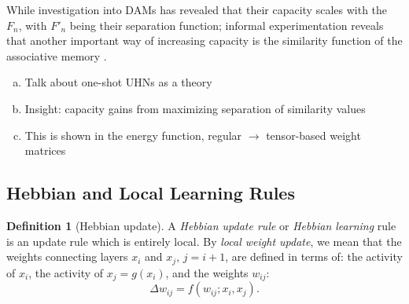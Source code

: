 \documentclass{article}
\theoremstyle{definition}
\newtheorem{definition}{Definition}[subsection]
\begin{document}
While investigation into DAMs has revealed that their capacity scales with
the $F_n$, with $F'_n$ being their separation function; informal experimentation
reveals that another important way of increasing capacity is the
similarity function
of the associative memory
\parencites{millidge_predictive_2022,hu_provably_2024}.

\begin{enumerate}[(a)]
  \item Talk about one-shot UHNs as a theory
  \item Insight: capacity gains from maximizing separation of similarity values
  \item This is shown in the energy function, regular $\to$
    tensor-based weight matrices
\end{enumerate}

\subsection{Hebbian and Local Learning Rules}\label{sec:hebb}

\begin{definition}[Hebbian update]
  A \textit{Hebbian update rule} or \textit{Hebbian learning} rule is an update
  rule which is entirely local. By \textit{local weight update}, we mean that
  the weights connecting layers $x_i$ and $x_j$, $j = i + 1$, are defined
  in terms of: the activity of $x_i$, the activity of $x_j = g(x_i)$, and
  the weights $w_{ij}$:
  \begin{equation}
    \Delta w_{ij} = f (w_{ij}; x_i, x_j).
  \end{equation}
\end{definition}
\end{document}
